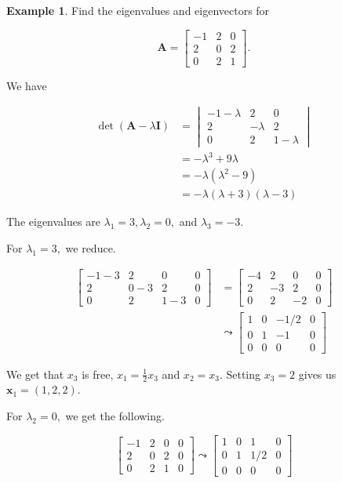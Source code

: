 \documentclass[
]{book}
\theoremstyle{definition}
\theoremstyle{definition}
\newtheorem{example}{Example}[chapter]
\theoremstyle{definition}
\theoremstyle{definition}
\theoremstyle{remark}
\begin{document}
\begin{examplebox}

\begin{example}
Find the eigenvalues and eigenvectors for

\[\mathbf{A}=\begin{bmatrix}-1 & 2 & 0\\2 & 0 & 2\\0 & 2 & 1\end{bmatrix}.\]

We have

\begin{align*}\det(\mathbf{A}-\lambda\mathbf{I})&=\begin{vmatrix}-1-\lambda & 2 & 0\\2 & -\lambda & 2\\0 & 2 & 1-\lambda\end{vmatrix}\\
&=-\lambda^3+9\lambda\\
&=-\lambda(\lambda^2-9)\\
&=-\lambda(\lambda+3)(\lambda-3)
\end{align*}

The eigenvalues are \(\lambda_1=3,\lambda_2=0,\) and \(\lambda_3=-3.\)

For \(\lambda_1=3,\) we reduce.

\begin{align*}
\left[\begin{array}{ccc|c}-1-3 & 2 & 0&0\\2 & 0-3 & 2&0\\0 & 2 & 1-3&0\end{array}\right]&=\left[\begin{array}{ccc|c} -4 & 2 & 0&0\\2 & -3 & 2&0\\0 & 2 & -2&0\end{array}\right] \\
&\leadsto \left[\begin{array}{ccc|c} 1 & 0 & -1/2 &0\\0 & 1 & -1&0\\0 & 0 & 0&0\end{array}\right]
\end{align*}

We get that \(x_3\) is free, \(x_1=\frac{1}{2}x_3\) and \(x_2=x_3\). Setting \(x_3=2\) gives us \(\mathbf{x}_1=(1,2,2).\)

For \(\lambda_2=0,\) we get the following.

\[
\left[\begin{array}{ccc|c}-1 & 2 & 0&0\\2 & 0 & 2&0\\0 & 2 & 1&0\end{array}\right]\leadsto \left[\begin{array}{ccc|c} 1 & 0 & 1 &0\\0 & 1 & 1/2&0\\0 & 0 & 0&0\end{array}\right]
\]


\end{example}
\end{examplebox}
\end{document}
